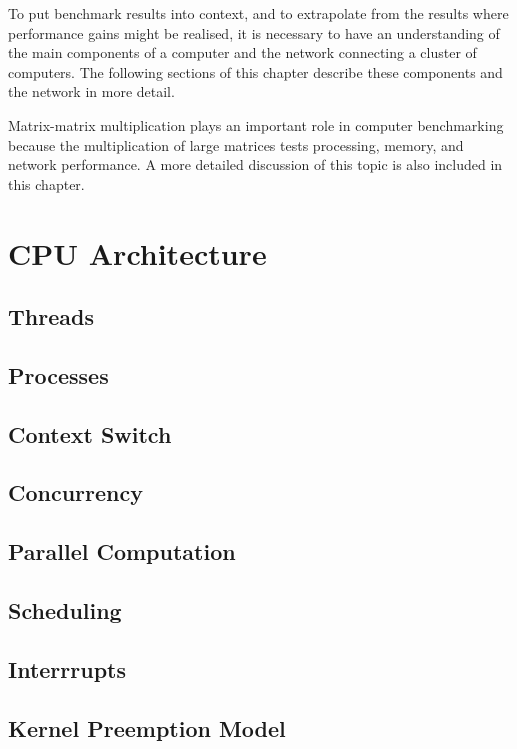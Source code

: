 \documentclass{report}
\begin{document}
To put benchmark results into context, and to extrapolate from the results where performance gains might be realised, it is necessary to have an understanding of the main components of a computer and the network connecting a cluster of computers. The following sections of this chapter describe these components and the network in more detail.

Matrix-matrix multiplication plays an important role in computer benchmarking because the multiplication of large matrices tests processing, memory, and network performance. A more detailed discussion of this topic is also included in this chapter. 


%
%
\section{CPU Architecture}

\subsection{Threads}

\subsection{Processes}

\subsection{Context Switch}

\subsection{Concurrency}

\subsection{Parallel Computation}

\subsection{Scheduling}

\subsection{Interrrupts}

\subsection{Kernel Preemption Model}
\end{document}
